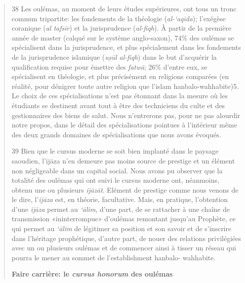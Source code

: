 \begin{quote}
38 Les oulémas, au moment de leurs études supérieures, ont tous un tronc
commun tripartite: les fondements de la théologie (\emph{al-`aqīda});
l'exégèse coranique (\emph{al tafsīr}) et la jurisprudence
(\emph{al-fiqh}). À partir de la première année de master (calqué sur le
système anglo-saxon), 74\% des oulémas se spécialisent dans la
jurisprudence, et plus spécialement dans les fondements de la
jurisprudence islamique (\emph{uṣūl al-fiqh}) dans le but d'acquérir la
qualification requise pour émettre des \emph{fatwā}; 26\% d'entre eux,
se spécialisent en théologie, et plus précisément en religions comparées
(en réalité, pour dénigrer toute autre religion que l'islam
hanbalo-wahhabite)5\emph{.} Le choix de ces spécialisations n'est pas
étonnant dans la mesure où les étudiants se destinent avant tout à être
des techniciens du culte et des gestionnaires des biens de salut. Nous
n'entrerons pas, pour ne pas alourdir notre propos, dans le détail des
spécialisations pointues à l'intérieur même des deux grands domaines de
spécialisations que nous avons évoqués.

39 Bien que le cursus moderne se soit bien implanté dans le paysage
saoudien, l'ijāza
n'en demeure pas moins source de prestige et un élément non négligeable
dans un
capital social. Nous avons pu observer que la totalité des oulémas qui
ont suivi le cursus moderne ont, néanmoins, obtenu une ou plusieurs
\emph{ijāzāt}. Elément de prestige comme nous venons de le dire,
l'\emph{ijāza} est, en théorie, facultative. Mais, en pratique,
l'obtention d'une \emph{ijāza} permet au \emph{`ālim}, d'une part, de se
rattacher à une chaîne de transmission
«ininterrompue» d'oulémas remontant jusqu'au Prophète, ce qui permet au
\emph{`ālim} de légitimer sa position et son savoir et de s'inscrire
dans l'héritage prophétique, d'autre part, de nouer des relations
privilégiées avec un ou plusieurs oulémas et de commencer ainsi à tisser
un réseau qui pourra le mener au sommet de l'establishment hanbalo-
wahhabite.

\textbf{Faire carrière: le \emph{cursus honorum} des oulémas}


\end{quote}
